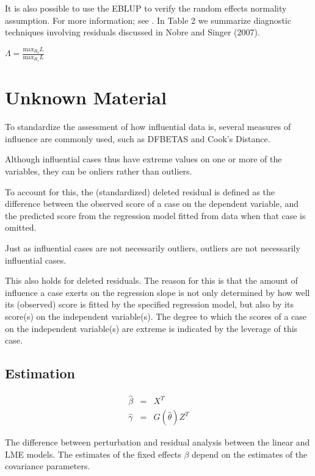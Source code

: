 \documentclass[12pt, a4paper]{report}
\theoremstyle{plain}
\theoremstyle{definition}
\theoremstyle{remark}
\begin{document}
It is also possible to use the EBLUP
to verify the random effects normality assumption. For more information; see \citet{nobresinger}. In Table 2 we summarize diagnostic techniques involving residuals discussed
in Nobre and Singer (2007).


$\Lambda = \frac{\mbox{max}_{H_{0}}L}{\mbox{max}_{H_{1}}L}$
	

\section{Unknown Material}


To standardize the assessment of how influential data is, several measures of influence are commonly used, such as DFBETAS 
and Cook’s Distance.

Although influential cases thus have extreme values on one or more of the variables, they can be onliers
rather than outliers. 

To account for this, the (standardized) deleted residual is defined as the difference between
the observed score of a case on the dependent variable, and the predicted score from the regression
model fitted from data when that case is omitted.

Just as influential cases are not necessarily outliers, outliers are not necessarily influential cases. 

This also holds for deleted residuals. The reason for this is that the amount of influence a case exerts on the regression slope is not only determined by how well its (observed) score is fitted by the specified regression model, but also by its score(s) on the independent variable(s). The degree to which the scores of a case on the independent variable(s) are extreme is indicated by the leverage of this case. 




\subsection{Estimation}

\begin{eqnarray}
\hat{\beta} &=& X^{T} \\
\hat{\gamma} &=& G(\hat{\theta})Z^{T}
\end{eqnarray}

The difference between perturbation and residual analysis between the linear and LME models.
The estimates of the fixed effects $\beta$ depend on the estimates of the covariance parameters.
\end{document}
